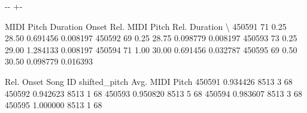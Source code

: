 \documentclass[letterpaper,10pt,english]{sphinxmanual}
\newlength\nbsphinxcodecellspacing
\begin{document}
{

\kern-\sphinxverbatimsmallskipamount\kern-\baselineskip
\kern+\FrameHeightAdjust\kern-\fboxrule
\vspace{\nbsphinxcodecellspacing}

\begin{sphinxVerbatim}[commandchars=\\\{\}]
\llap{\color{nbsphinxout}[270]:\,\hspace{\fboxrule}\hspace{\fboxsep}}        MIDI Pitch  Duration  Onset  Rel. MIDI Pitch  Rel. Duration  \textbackslash{}
450591          71      0.25  28.50         0.691456       0.008197
450592          69      0.25  28.75         0.098779       0.008197
450593          73      0.25  29.00         1.284133       0.008197
450594          71      1.00  30.00         0.691456       0.032787
450595          69      0.50  30.50         0.098779       0.016393

        Rel. Onset  Song ID  shifted\_pitch  Avg. MIDI Pitch
450591    0.934426     8513              3               68
450592    0.942623     8513              1               68
450593    0.950820     8513              5               68
450594    0.983607     8513              3               68
450595    1.000000     8513              1               68
\end{sphinxVerbatim}
}

{
\begin{sphinxVerbatim}[commandchars=\\\{\}]
\llap{\color{nbsphinxin}[271]:\,\hspace{\fboxrule}\hspace{\fboxsep}}  \PYG{p}{[}\PYG{p}{]} \PYG{p}{[}\PYG{p}{]}  
\end{sphinxVerbatim}
}
\end{document}
